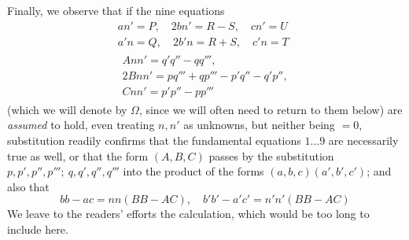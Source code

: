 Finally, we observe that if the nine equations
\[
\begin{gathered}
an'=P,\quad 2bn'=R-S,\quad cn'=U\\
a'n=Q,\quad 2b'n=R+S,\quad c'n=T\\
\begin{gathered}Ann'=q'q''-qq''',\\2Bnn'=pq'''+qp'''-p'q''-q'p'',\\Cnn'=p'p''-pp'''\end{gathered}
\end{gathered}
\]
(which we will denote by $\Omega$, since we will often need to return to them below) are \textit{assumed} to hold, even treating $n,n'$ as unknowns, but neither being $=0$, substitution readily confirms that the fundamental equations $1\ldots9$ are necessarily true as well, or that the form $(A,B,C)$ passes by the substitution $p,p',p'',p''';\ q,q',q'',q'''$ into the product of the forms $(a,b,c)(a',b',c')$; and also that
\[
bb-ac=nn(BB-AC),\quad b'b'-a'c'=n'n'(BB-AC)
\]
We leave to the readers' efforts the calculation, which would be too long to include here.
